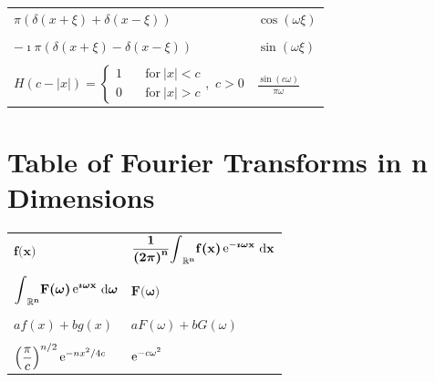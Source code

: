 \begin{longtable}{ll}
  \\
  $\displaystyle \pi( \delta(x + \xi) + \delta(x - \xi) )$
  & $\displaystyle \cos(\omega \xi)$ \\
  \\
  $\displaystyle - \imath \pi( \delta(x + \xi) - \delta(x - \xi) )$
  & $\displaystyle \sin(\omega \xi)$ \\
  \\
  $\displaystyle H(c - |x|) = \begin{cases}
    1 \quad &\mathrm{for}\ |x| < c \\
    0 \quad &\mathrm{for}\ |x| > c 
  \end{cases}$,\ $c > 0$
  & $\displaystyle \frac{\sin(c \omega)}{\pi \omega}$
\end{longtable}











\pagebreak
\section{Table of Fourier Transforms in n Dimensions}


\setlongtables
\begin{longtable}{ll}
  $\displaystyle \mathbf{f  \boldsymbol{(} x \boldsymbol{)}}$
  &
  $\displaystyle \mathbf{\frac{1}{\boldsymbol{(} 2\boldsymbol{\pi} \boldsymbol{)}^n} 
    \boldsymbol{\int}_{\mathbb{R}^n} f \boldsymbol{(} x \boldsymbol{)}  \mathop{\mathrm{e}}\nolimits^{-\boldsymbol{\imath} \boldsymbol{\omega} x}\,\mathrm{d} x }$ \\
  \\
  $\displaystyle \mathbf{\boldsymbol{\int}_{\mathbb{R}^n} F \boldsymbol{(} \boldsymbol{\omega} \boldsymbol{)} 
    \mathop{\mathrm{e}}\nolimits^{\boldsymbol{\imath} \boldsymbol{\omega} x} \,\mathrm{d}\boldsymbol{\omega} }$
  &
  $\displaystyle \mathbf{ F \boldsymbol{(} \omega \boldsymbol{)}}$  \\
  \\
  $\displaystyle a f(x) + b g(x)$
  &
  $\displaystyle a F(\omega) + b G(\omega)$ \\
  \\
  $\displaystyle \left( \frac{\pi}{c} \right)^{n/2} \mathop{\mathrm{e}}\nolimits^{-n x^2 / 4c}$
  &
  $\displaystyle \mathop{\mathrm{e}}\nolimits^{-c \omega^2}$
\end{longtable}



